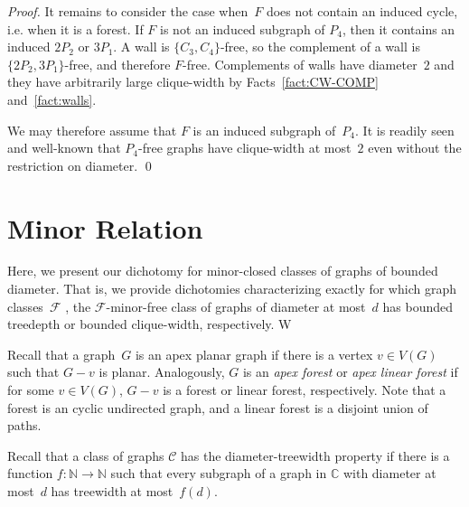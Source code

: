\documentclass[runningheads,envcountsame]{llncs}
\newcommand{\forbiddenGraph}{F}
\newcommand{\forbiddenClass}{\mathcal{F}}
\begin{document}
\begin{proof}
  It remains to consider the case when~$\forbiddenGraph$ does not contain an induced cycle, i.e. when it is a forest. If
  $\forbiddenGraph$ is not an induced subgraph of $P_4$, then it contains an induced $2P_2$ or $3P_1$.
  A wall is $\{C_3,C_4\}$-free, so the complement of a wall is $\{2P_2,3P_1\}$-free, and therefore $\forbiddenGraph$-free.
  Complements of walls have diameter~$2$ and they have arbitrarily large clique-width by Facts~\ref{fact:CW-COMP} and~\ref{fact:walls}.

  We may therefore assume that $\forbiddenGraph$ is an induced subgraph of~$P_4$.
  It is readily seen and well-known that $P_4$-free graphs have clique-width at most~$2$ even without the restriction on diameter. \qed
\end{proof}


\section{Minor Relation}\label{sec:minor}
Here, we
present our dichotomy for minor-closed classes of graphs of
bounded diameter. That is, we provide dichotomies characterizing
exactly for which graph classes~$\forbiddenClass$ , the
$\forbiddenClass$-minor-free class of graphs of diameter at most~$d$ has
bounded treedepth or bounded clique-width, respectively. W

Recall that a graph~$G$ is an apex planar graph if there is a vertex $v\in V(G)$
such that $G-v$ is planar. Analogously, $G$ is an \emph{apex forest}
or \emph{apex linear forest} if for some $v\in V(G)$, $G-v$ is a
forest or linear forest, respectively. Note that a forest is an cyclic
undirected graph, and a linear forest is a disjoint union of paths.

Recall that a class of graphs $\mathcal{C}$ has the diameter-treewidth property if there is a function
$f:\mathbb{N}\rightarrow \mathbb{N}$ such that every subgraph of a
graph in $\mathbb{C}$ with diameter at most~$d$ has treewidth at most~$f(d)$.  
\end{document}
